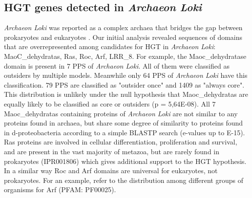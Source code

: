 \subsection{HGT genes detected in \textit{Archaeon Loki}} \textit{Archaeon
Loki} was reported as a complex archaea that bridges the gap between
prokaryotes and eukaryotes \cite{Spang2015}. Our initial analysis revealed
sequences of domains that are overrepresented among candidates for HGT in
\textit{Archaeon Loki}: MaoC\_dehydratas, Ras, Roc, Arf, LRR\_8. For example,
the Maoc\_dehydratase domain is present in 7 PPS of \textit{Archaeon Loki}. All
of them were classified as outsiders by multiple models. Meanwhile only 64 PPS
of \textit{Archaeon Loki} have this classification. 79 PPS are classified as
"outsider once" and 1409 as "always core". This distribution is unlikely under
the null hypothesis that Maoc\_dehydratas are equally likely to be classified
as core or outsiders (p = 5,64E-08). All 7 Maoc\_dehydratas containing proteins
of \textit{Archaeon Loki} are not similar to any proteins found in archaea, but
share some degree of similarity to proteins found in d-proteobacteria according
to a simple BLASTP search (e-values up to E-15).  Ras proteins are involved in
cellular differentiation, proliferation and survival, and are present in the
vast majority of metazoa, but are rarely found in prokaryotes (IPR001806) which
gives additional support to the HGT hypothesis. In a similar way Roc and Arf
domains are universal for eukaryotes, not prokaryotes. For an example, refer to the
distribution among different groups of organisms for Arf (PFAM: PF00025).
